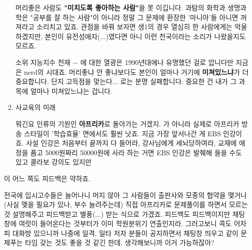 \begin{enumerate}
    머리좋은 사람도 \textbf{"미치도록 좋아하는 사람"}을 못 이깁니다.
    과탐의 화학과 생명과학은 "공부를 잘 하는 사람"이 아니라 정말 그 문제에 환장한 '마니아'들 아니면 꺼져라고 소리치고 있죠.
    관점을 바꿔 보자면 생1의 경우 열심히 한 사람에게는 억울하겠지만, 본인이 유전성애자(...)였다면 아니 이런 천국이라는 소리가 나왔을지도 모르죠.
    \vspace{5mm}

    소위 지능지수 천재 $-$ 에 대한 열광은 1990년대에나 유명했던 걸로 압니다만
    지금은 nerd의 시대죠.
    머리좋냐 안 좋냐보다도 본인이 얼마나 거기에 \textbf{미쳐있느냐}가 더 중요합니다.
    단지 고득점을 맞는다... 로는 분명 실패합니다. 중요한 건 내가 그 과목에 얼마나 미쳐있느냐는 겁니다.
    \vspace{5mm}

    \item 사교육의 미래
    \vspace{5mm}

    뭐긴요 인류의 기원인 \textbf{아프리카}로 돌아가는 거겠지.
    가 아니라 실제로 아프리카 방송 스타일이 '학습효율' 면에서도 훨씬 낫죠.
    지금 가장 앞서나간 게 EBS 인강이죠.
    사설 인강은 처음부터 끝까지 다 들어라, 강사님에게 세뇌당하여라, 교재에 애정을 품고 5000원짜리 50000원에 사라 하는 거면
    EBS  인강은 발췌해 들을 수도 있고 콜라보 강의도 있지만
    \vspace{5mm}


\end{enumerate}

이 어느 쪽도 피드백은 약하죠.
\vspace{5mm}

전국에 입시고수들은 늘어나니 머지 않아 그 사람들이 출판사와 모종의 협약을 맺거나(사실 맺을 필요가 있나, 부수 늘려주는데)
직접 아프리카로 문제풀이를 하면서 모르는 것 설명해주고 피드백받고 별풍(...) 받는 식으로 가겠죠.
피드백도 피드백이지만 채팅창에 여럿이 들어온다는 것부터가 이미 학원분위기 연출인지라.
그러고보니 콕도 어차피 대화방 있으니까 나중에 일격, 일타 저자 분들이 공지하면서
채팅창 띄우고 같이 문제푸는 타임 갖는 것도 좋을 것 같긴 한데. 생각해보니까 이거 가능하잖아?
\vspace{5mm}


